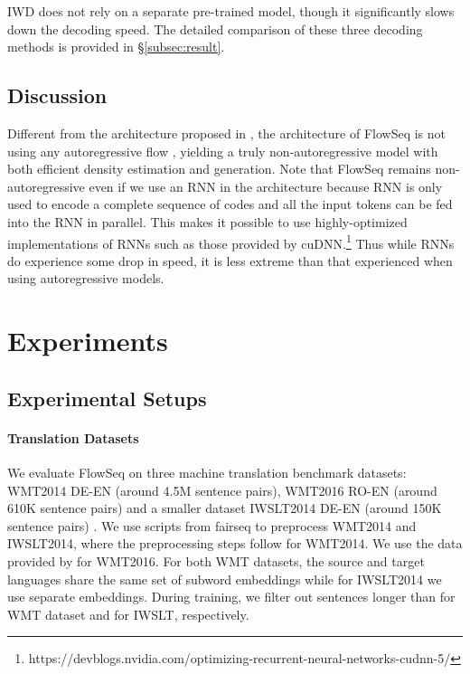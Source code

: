 \documentclass[11pt,a4paper]{article}
\begin{document}
IWD does not rely on a separate pre-trained model, though it significantly slows down the decoding speed.
The detailed comparison of these three decoding methods is provided in \S\ref{subsec:result}.

\subsection{Discussion}
Different from the architecture proposed in \citet{ziegler2019latent}, the architecture of FlowSeq is not using any autoregressive flow \citep{kingma1606improving,papamakarios2017masked}, yielding a truly non-autoregressive model with both efficient density estimation and generation.
Note that FlowSeq remains non-autoregressive even if we use an RNN in the architecture because RNN is only used to encode a complete sequence of codes and all the input tokens can be fed into the RNN in parallel.
This makes it possible to use highly-optimized implementations of RNNs such as those provided by cuDNN.\footnote{https://devblogs.nvidia.com/optimizing-recurrent-neural-networks-cudnn-5/}
Thus while RNNs do experience some drop in speed, it is less extreme than that experienced when using autoregressive models. 

\section{Experiments}
\subsection{Experimental Setups}
\paragraph{Translation Datasets}
We evaluate FlowSeq on three machine translation benchmark datasets: WMT2014 DE-EN (around 4.5M sentence pairs), WMT2016 RO-EN (around 610K sentence pairs) and a smaller dataset IWSLT2014 DE-EN (around 150K sentence pairs) \cite{cettolo2012wit3}. We use scripts from fairseq \cite{ott2019fairseq} to preprocess WMT2014 and IWSLT2014, where the preprocessing steps follow  \citet{vaswani2017attention} for WMT2014. We use the data provided by \citet{lee2018deterministic} for WMT2016. For both WMT datasets, the source and target languages share the same set of subword embeddings while for IWSLT2014 we use separate embeddings.
During training, we filter out sentences longer than  for WMT dataset and  for IWSLT, respectively.
\end{document}
